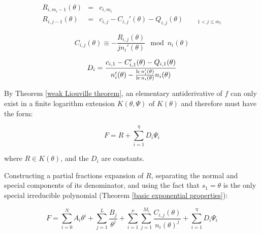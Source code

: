 \begin{subequations}
\begin{eqnarray}
R_{i,m_i-1}(\theta) & = & c_{i,m_i} \\
R_{i,j-1}(\theta) & = & c_{i,j} - C_{i,j}'(\theta) - Q_{i,j}(\theta) \qquad {}_{1<j\le m_i}
\end{eqnarray}
\end{subequations}


\begin{equation}
C_{i,j}(\theta) \equiv - \frac{R_{i,j}(\theta)}{jn_i'(\theta)} \mod n_i(\theta)
\end{equation}

\begin{equation}
\label{eq: exponential Ds}
D_i = \frac{c_{i,1} - C_{i,1}'(\theta) - Q_{i,1}(\theta)}{n_i'(\theta) - \frac{{\rm lc\,} n_i'(\theta)}{{\rm lc\,} n_i(\theta)} n_i(\theta)}
\end{equation}

\vfill\eject
\proof


By Theorem \ref{weak Liouville theorem}, an elementary antiderivative
of $f$ can only exist in a finite logarithm extension $K(\theta, \Psi)$
of $K(\theta)$ and therefore must have the form:

$$F = R + \sum_{i=1}^\eta D_i \Psi_i$$

where $R \in K(\theta)$, and the $D_i$ are constants.

Constructing a partial fractions expansion of $R$,
separating the normal and special components of its denominator,
and using the fact that $s_1 = \theta$ is the only
special irreducible polynomial
(Theorem \ref{basic exponential properties}):

\begin{comment}
$$F = \sum_{i=0}^N A_i \theta^i + \sum_{i=1}^\mu \sum_{j=1}^{l_i} \frac{B_{ij}(\theta)}{s_i(\theta)^j}
+ \sum_{i=1}^\nu \sum_{j=1}^{m_i} \frac{C_{i,j}(\theta)}{n_i(\theta)^j}
+ \sum_{i=1}^\eta D_i \Psi_i$$

Let's use the fact that $s_1 = \theta$ is the only
special irreducible polynomial:
\end{comment}

$$F = \sum_{i=0}^N A_i \theta^i + \sum_{j=1}^{L} \frac{B_{j}}{\theta^j}
+ \sum_{i=1}^\nu \sum_{j=1}^{M_i} \frac{C_{i,j}(\theta)}{n_i(\theta)^j}
+ \sum_{i=1}^\eta D_i \Psi_i$$

